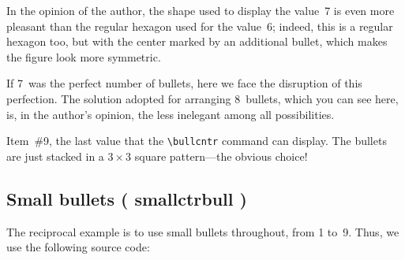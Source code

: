 \documentclass[a4paper]{article}
\DeclareRobustCommand*{\command}[1]{%
	{\texorpdfstring{\normalfont\ttfamily \char\escapechar}{\pdfbslash}#1}%
}
\newcommand*{\pdfbslash}{}
{\catcode`\|=0 |catcode`|\=12 |gdef|pdfbslash{\\}}
\begin{document}
\begin{bullenum}
	\item
		In the opinion of the author, the shape used to display the
		value~7 is even more pleasant than the regular hexagon used
		for the value~6; indeed, this is a regular hexagon too, but
		with the center marked by an additional bullet, which makes
		the figure look more symmetric.

	\item
		If 7~was the perfect number of bullets, here we face the
		disruption of this perfection.  The solution adopted for
		arranging 8~bullets, which you can see here, is, in the
		author's opinion, the less inelegant among all possibilities.

	\item
		Item~\#9, the last value that the \verb|\bullcntr| command can
		display.  The bullets are just stacked in a $3\times3$ square
		pattern---the obvious choice!
\end{bullenum}



\subsection{Small bullets (\command{smallctrbull})}

The reciprocal example is to use small bullets throughout, from 1 to~9.
Thus, we use the following source code:
\end{document}
